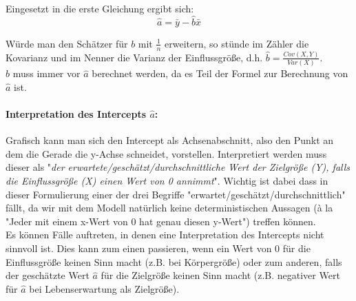 \documentclass[a4paper]{article}
\newcommand\dangersign[1][2ex]{%
  \renewcommand\stacktype{L}%
  \scaleto{\stackon[1.3pt]{\color{red}$\triangle$}{\tiny !}}{#1}%
}
\begin{document}
\noindent Eingesetzt in die erste Gleichung ergibt sich:
$$\hat{a}=\bar{y}-\hat{b}\bar{x}$$

\noindent Würde man den Schätzer für $b$ mit $\frac{1}{n}$ erweitern, so stünde im Zähler die Kovarianz und im Nenner die Varianz der Einflussgröße, d.h. $\hat{b}=\frac{Cov(X,Y)}{Var(X)}$.\\

\noindent \dangersign[3ex] $\hat b$ muss immer vor $\hat a$ berechnet werden, da es Teil der Formel zur Berechnung von $\hat a$ ist.

\paragraph{Interpretation des Intercepts $\hat a$:} Grafisch kann man sich den Intercept als Achsenabschnitt, also den Punkt an dem die Gerade die y-Achse schneidet, vorstellen. Interpretiert werden muss dieser als "\textit{der erwartete/geschätzt/durchschnittliche Wert der Zielgröße (Y), falls die Einflussgröße (X) einen Wert von 0 annimmt}". Wichtig ist dabei dass in dieser Formulierung einer der drei Begriffe "erwartet/geschätzt/durchschnittlich" fällt, da wir mit dem Modell natürlich keine deterministischen Aussagen (à la "Jeder mit einem x-Wert von 0 hat genau diesen y-Wert") treffen können.\\

\noindent \dangersign[3ex] Es können Fälle auftreten, in denen eine Interpretation des Intercepts nicht sinnvoll ist. Dies kann zum einen passieren, wenn ein Wert von 0 für die Einflussgröße keinen Sinn macht (z.B. bei Körpergröße) oder zum anderen, falls der geschätzte Wert $\hat a$ für die Zielgröße keinen Sinn macht (z.B. negativer Wert für $\hat a$ bei Lebenserwartung als Zielgröße).
\end{document}
